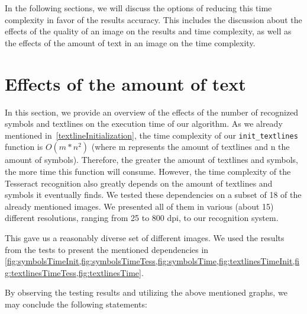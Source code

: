 In the following sections, we will discuss the options of reducing this time complexity in favor of the results accuracy. This includes the discussion about the effects of the quality of an image on the results and time complexity, as well as the effects of the amount of text in an image on the time complexity.

\section{Effects of the amount of text} \label{resultsEffectsOfText}

In this section, we provide an overview of the effects of the number of recognized symbols and textlines on the execution time of our algorithm. As we already mentioned in~\cref{textlineInitialization}, the time complexity of our \texttt{init\_textlines} function is $O(m*n^2)$ (where m represents the amount of textlines and n the amount of symbols). Therefore, the greater the amount of textlines and symbols, the more time this function will consume. However, the time complexity of the Tesseract recognition also greatly depends on the amount of textlines and symbols it eventually finds. We tested these dependencies on a subset of 18 of the already mentioned images. We presented all of them in various (about 15) different resolutions, ranging from 25 to 800 dpi, to our recognition system. 

This gave us a reasonably diverse set of different images. We used the results from the tests to present the mentioned dependencies in \cref{fig:symbolsTimeInit,fig:symbolsTimeTess,fig:symbolsTime,fig:textlinesTimeInit,fig:textlinesTimeTess,fig:textlinesTime}.

By observing the testing results and utilizing the above mentioned graphs, we may conclude the following statements:

